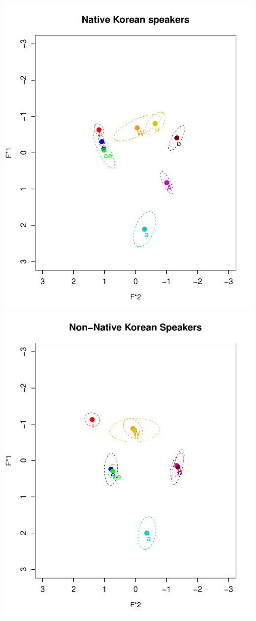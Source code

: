 \documentclass[man, fleqn, noextraspace]{apa6}
\begin{document}
\includegraphics{Group_5_Final_paper_files/figure-latex/Vowel Chart of Mean Values-1.pdf}
\includegraphics{Group_5_Final_paper_files/figure-latex/Vowel Chart of Mean Values-2.pdf}
\end{document}
